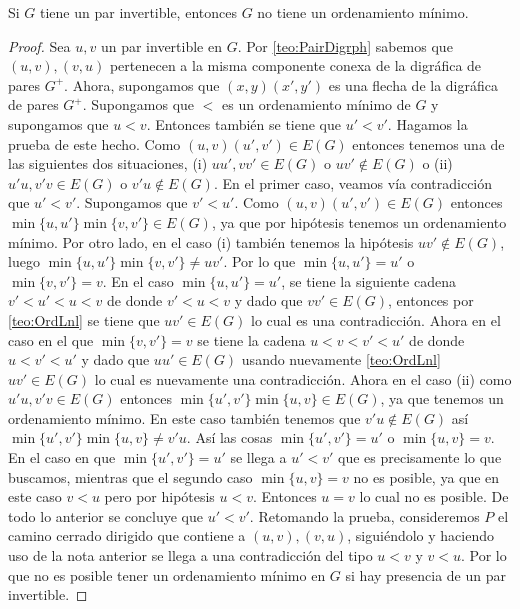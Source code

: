 \begin{teorema}
    \label{teo:OrnMin_NoInvPair}
    Si $G$ tiene un par invertible, entonces $G$ no tiene un ordenamiento
    mínimo.
\end{teorema}

\begin{proof}
    Sea $u,v$ un {\color{malva} par invertible} en $G$. Por
    \cref{teo:PairDigrph} sabemos que $(u,v),(v,u)$ pertenecen a la misma
    componente conexa de la digr\'afica de pares $G^+$. Ahora, supongamos que
    $(x,y)(x', y')$ es una flecha de la digr\'afica de pares $G^+$. Supongamos
    que $<$ es un ordenamiento mínimo de $G$ y supongamos que $ u < v$. Entonces
    tambi\'en se tiene que $u'< v'$. Hagamos la prueba de este hecho. Como
    $(u,v)(u',v')\in E(G)$ entonces tenemos una de las siguientes dos
    situaciones, (i) $uu', vv'\in E(G)$ o $uv'\notin E(G) $ o (ii) $u'u, v'v \in
    E(G)$ o $ v'u \notin E(G) $. En el primer caso, veamos vía contradicci\'on
    que $u'<v'$.  Supongamos que $v'<u'$. Como $(u,v)(u',v')\in E(G)$ entonces
    $\min \{u,u' \}\min \{v,v' \}\in E(G)$, ya que por hip\'otesis tenemos un
    ordenamiento mínimo. Por otro lado, en el caso (i) tambi\'en tenemos la
    hip\'otesis $uv'\notin E(G)$, luego $\min \{u,u' \}\min \{v,v' \} \neq uv'$.
    Por lo que $\min \{u,u' \}=u'$ o $\min \{v,v' \}= v$. En el caso $\min
    \{u,u' \}=u'$, se tiene la siguiente cadena $v'<u'<u<v$ de donde $v'<u<v$ y
    dado que $vv'\in E(G)$, entonces por \cref{teo:OrdLnl} se tiene que $uv'\in
    E(G)$ lo cual es una contradicci\'on. Ahora en el caso en el que $\min
    \{v,v' \}= v$ se tiene la cadena $u<v<v'<u'$ de donde $u<v'<u'$ y dado que
    $uu'\in E(G)$ usando nuevamente \cref{teo:OrdLnl} $uv' \in E(G)$ lo cual es
    nuevamente una contradicci\'on. Ahora en el caso (ii) como $u'u, v'v \in
    E(G)$ entonces $\min \{u',v' \}\min \{u,v \}\in E(G)$, ya que tenemos un
    ordenamiento mínimo. En este caso tambi\'en tenemos que $v'u\notin E(G)$ así
    $\min \{u',v' \}  \min \{u,v \}\neq v'u$. Así las cosas $\min \{u',v' \}=u'$
    o $\min \{u,v \}=v$. En el caso en que $\min \{u',v' \}=u'$ se llega a
    $u'<v'$ que es precisamente lo que buscamos, mientras que el segundo caso
    $\min \{u,v \}=v$ no es posible, ya que en este caso $v<u$ pero por
    hip\'otesis $u<v$. Entonces $u = v$ lo cual no es posible. De todo lo
    anterior se concluye que $u'<v'$.    
    Retomando la prueba, consideremos $P$ el camino cerrado dirigido que
    contiene a $(u,v),(v,u)$, sigui\'endolo y haciendo uso de la nota anterior
    se llega a una contradicci\'on del tipo $u<v$ y $v<u$. Por lo que no es
    posible tener un ordenamiento mínimo en $G$ si hay presencia de un par
    invertible.
\end{proof}

